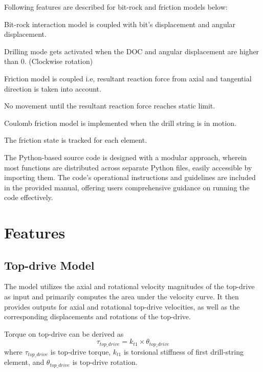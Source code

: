 Following features are described for bit-rock and friction models below:
\begin{bulletedlist}
    \item Bit-rock interaction model is coupled with bit's displacement and angular displacement.
    \item Drilling mode gets activated when the DOC and angular displacement are higher than 0. (Clockwise rotation) 
    \item Friction model is coupled i.e, resultant reaction force from axial and tangential direction is taken into account.
    \item No movement until the resultant reaction force reaches static limit.
    \item Coulomb friction model is implemented when the drill string is in motion.
    \item The friction state is tracked for each element.
\end{bulletedlist}

The Python-based source code is designed with a modular approach, wherein most functions are distributed across separate Python files, easily accessible by importing them. The code's operational instructions and guidelines are included in the provided manual, offering users comprehensive guidance on running the code effectively.

\section{Features}
\subsection{Top-drive Model}

The model utilizes the axial and rotational velocity magnitudes of the top-drive as input and primarily computes the area under the velocity curve. It then provides outputs for axial and rotational top-drive velocities, as well as the corresponding displacements and rotations of the top-drive.

Torque on top-drive can be derived as
\begin{equation}\label{TorqueEQ}
  \tau_{top\_drive} = k_{t1} \times \theta_{top\_drive}
\end{equation}
where 
$\tau_{top\_drive}$ is top-drive torque, $k_{t1}$ is torsional stiffness of first drill-string element, and $\theta_{top\_drive}$ is top-drive rotation.

